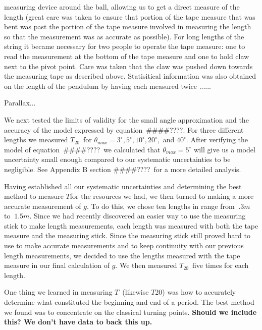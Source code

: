 \documentclass[iop,numberedappendix,appendixfloats]{emulateapj}
\def\g{$g$}
\def\T{$T$}
\def\Ttwen{$T_{20}$}
\def\fillin{\#\#\#\#????}
\def\deg{^{\circ}}
\begin{document}
measuring device around the ball, allowing us to get a direct measure of the 
length (great care was taken to ensure that portion of the tape measure that 
was bent was past the portion of the tape measure involved in measuring the 
length so that the measurement was as accurate as possible). For long lengths 
of the string it became necessary for two people to operate the tape measure:
one to read the measurement at the bottom of the tape measure and one to hold 
claw next to the pivot point.  Care was taken that the claw was pushed down 
towards the measuring tape as described above.  Statisitical information was 
also obtained on the length of the pendulum by having each measured twice
......%

Parallax...

We next tested the limits of validity for the small angle approximation and 
the accuracy of the model expressed by equation~\fillin. %
For three different lengths we measured \Ttwen\ for $\theta_{max} = 3\deg, 
5\deg, 10\deg, 20\deg,$ and $40\deg$.  %
After verifying the model of equation~\fillin\ we calculated that 
$\theta_{max}=5\deg$ will give us a model uncertainty small enough compared 
to our systematic uncertainties to be negligible.  See Appendix B section 
\fillin\ for a more detailed analysis.

Having established all our systematic uncertainties and determining the best 
method to measure \T for the resources we had, we then turned to making a more 
accurate measurement of \g.  To do this, we chose ten lengths in range from 
$~.3m$ to $~1.5m$.  Since we had recently discovered an easier way to use the 
measuring stick to make length measurements, each length was measured with 
both the tape measure and the measuring stick.  Since the measuring stick 
still proved hard to use to make accurate measurements and to keep continuity 
with our previous length measurements, we decided to use the lengths measured 
with the tape measure in our final calculation of \g. We then measured 
\Ttwen\ five times for each length.  

One thing we learned in measuring \T\ (likewise \T20) was how to accurately 
determine what constituted the beginning and end of a period.  The best 
method we found was to concentrate on the classical turning points. {\bf 
Should we include this?  We don't have data to back this up.}
\end{document}
